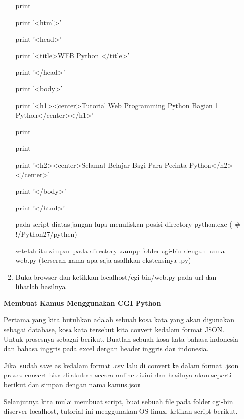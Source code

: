 \begin{enumerate}
\begin{enumerate}
	\noindent 
	print \par
	\noindent 
	print '<html>' \par
	\noindent 
	print '<head>' \par
	\noindent 
	print '<title>WEB Python </title>' \par
	\noindent 
	print '</head>' \par
	\noindent 
	print '<body>' \par
	\noindent 
	print '<h1><center>Tutorial Web Programming Python Bagian 1 Python</center></h1>' \par
	\noindent 
	print \par
	\noindent 
	print \par
	\noindent 
	print '<h2><center>Selamat Belajar Bagi Para Pecinta Python</h2></center>' \par
	\noindent 
	print '</body>' \par
	\noindent 
	print '</html>' \par
	pada script diatas jangan lupa menuliskan posisi directory python.exe ( $  \#  $!/Python27/python) \par
	\noindent 
	setelah itu simpan pada directory xampp folder cgi-bin dengan nama web.py (terserah nama apa saja asalhkan ekstensinya .py) \par
	\noindent 
	\item Buka browser dan ketikkan localhost/cgi-bin/web.py pada url dan lihatlah hasilnya\end{enumerate}
\par
\vspace{12pt}
\noindent 
\textbf{Membuat Kamus Menggunakan CGI Python} \par
Pertama yang kita butuhkan adalah sebuah kosa kata yang akan digunakan sebagai database, kosa kata tersebut kita convert kedalam format JSON. Untuk prosesnya sebagai berikut. Buatlah sebuah kosa kata bahasa indonesia dan bahasa inggris pada excel dengan header inggris dan indonesia. \par
\vspace{12pt}
Jika~sudah save as kedalam format .csv lalu di convert ke dalam format .json proses convert  bisa dilakukan secara online disini dan hasilnya akan seperti berikut dan simpan dengan nama kamus.json  \par
\vspace{12pt}
\noindent 
Selanjutnya kita mulai membuat script, buat sebuah file pada folder cgi-bin diserver localhost, tutorial ini menggunakan OS linux, ketikan script berikut. \par

\end{enumerate}

